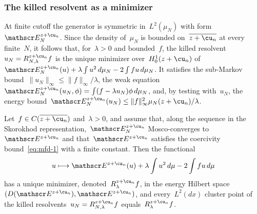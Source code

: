\documentclass[11pt]{amsart}
\begin{document}
\subsubsection{The killed resolvent as a minimizer}

At finite cutoff the generator is symmetric in~$L^2(\mu_N)$ with form~$\mathscr E_N^{z+\cu_n}$. Since the density of~$\mu_N$ is bounded on~$\overline{z+\cu_n}$ at every finite~$N$, it follows that, for~$\lambda>0$ and bounded~$f$, the killed resolvent~$u_N=R^{z+\cu_n}_{N,\lambda}f$ is the unique minimizer over~$H^1_0(z+\cu_n)$ of~$\mathscr E_N^{z+\cu_n}(u)+\lambda\int u^2\,d\mu_N-2\int fu\,d\mu_N$. It satisfies the sub-Markov bound~$\|u_N\|_\infty\leq\|f\|_\infty/\lambda$, the weak equation~$\mathscr E_N^{z+\cu_n}(u_N,\phi)=\int(f-\lambda u_N)\phi\,d\mu_N$, and, by testing with~$u_N$, the energy bound~$\mathscr E_N^{z+\cu_n}(u_N)\leq\|f\|_\infty^2\mu_N(z+\cu_n)/\lambda$.

\begin{proposition}
\label{mfd:prop-speed-resolvent}
Let~$f\in C(\overline{z+\cu_n})$ and~$\lambda>0$, and assume that, along the sequence in the Skorokhod representation,~$\mathscr E_N^{z+\cu_n}$ Mosco-converges to~$\mathscr E^{z+\cu_n}$ and that~$\mathscr E^{z+\cu_n}$ satisfies the coercivity bound~\eqref{eq:mfd-1} with a finite constant. Then the functional
\begin{equation}
	u\longmapsto \mathscr E^{z+\cu_n}(u)+\lambda\int u^2\,d\mu-2\int fu\,d\mu
	\label{eq:mfd-41}
\end{equation}
has a unique minimizer, denoted~$R^{z+\cu_n}_\lambda f$, in the energy Hilbert space~$(D(\mathscr E^{z+\cu_n}),\mathscr E^{z+\cu_n})$, and every~$L^2(dx)$ cluster point of the killed resolvents~$u_N=R^{z+\cu_n}_{N,\lambda}f$ equals~$R^{z+\cu_n}_\lambda f$.
\end{proposition}
\end{document}

